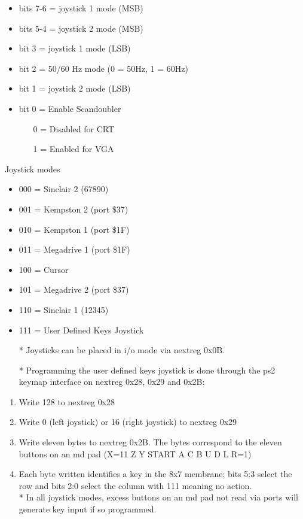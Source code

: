 \begin{itemize}
\item bits 7-6 = joystick 1 mode (MSB)
\item bits 5-4 = joystick 2 mode (MSB)
\item bit 3 = joystick 1 mode (LSB)
\item bit 2 = 50/60 Hz mode (0 = 50Hz, 1 = 60Hz)
\item bit 1 = joystick 2 mode (LSB)
\item bit 0 = Enable Scandoubler
\begin{itemize}
  \item[] 0 = Disabled for CRT
  \item[] 1 = Enabled for VGA
\end{itemize}
\end{itemize}
Joystick modes
\begin{itemize}
\item 000 = Sinclair 2 (67890)
\item 001 = Kempston 2 (port \$37)
\item 010 = Kempston 1 (port \$1F)
\item 011 = Megadrive 1 (port \$1F)
\item 100 = Cursor
\item 101 = Megadrive 2 (port \$37)
\item 110 = Sinclair 1 (12345)
\item 111 = User Defined Keys Joystick
\end{itemize}
\begin{itemize}
\item[*] Joysticks can be placed in i/o mode via nextreg 0x0B.
\item[*] Programming the user defined keys joystick is done through the ps2
keymap interface on nextreg 0x28, 0x29 and 0x2B:
\end{itemize}
\begin{enumerate}
\item Write 128 to nextreg 0x28
\item Write 0 (left joystick) or 16 (right joystick) to nextreg 0x29
\item Write eleven bytes to nextreg 0x2B. The bytes correspond to the eleven
buttons on an md pad (X=11 Z Y START A C B U D L R=1)
\item Each byte written identifies a key in the 8x7 membrane; bits 5:3 select
the row and bits 2:0 select the column with 111 meaning no action.\\ *
In all joystick modes, excess buttons on an md pad not read via ports
will generate key input if so programmed.
\end{enumerate}

